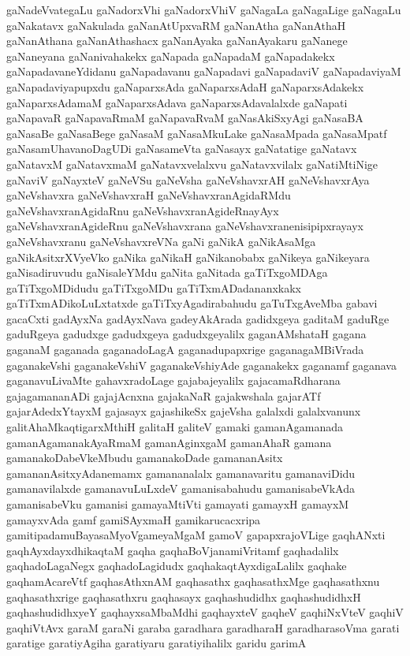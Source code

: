 {gaNadeVvategaLu
gaNadorxVhi
gaNadorxVhiV
gaNagaLa
gaNagaLige
gaNagaLu
gaNakatavx
gaNakulada
gaNanAtUpxvaRM
gaNanAtha
gaNanAthaH
gaNanAthana
gaNanAthashacx
gaNanAyaka
gaNanAyakaru
gaNanege
gaNaneyana
gaNanivahakekx
gaNapada
gaNapadaM
gaNapadakekx
gaNapadavaneYdidanu
gaNapadavanu
gaNapadavi
gaNapadaviV
gaNapadaviyaM
gaNapadaviyapupxdu
gaNaparxsAda
gaNaparxsAdaH
gaNaparxsAdakekx
gaNaparxsAdamaM
gaNaparxsAdava
gaNaparxsAdavalalxde
gaNapati
gaNapavaR
gaNapavaRmaM
gaNapavaRvaM
gaNasAkiSxyAgi
gaNasaBA
gaNasaBe
gaNasaBege
gaNasaM
gaNasaMkuLake
gaNasaMpada
gaNasaMpatf
gaNasamUhavanoDagUDi
gaNasameVta
gaNasayx
gaNatatige
gaNatavx
gaNatavxM
gaNatavxmaM
gaNatavxvelalxvu
gaNatavxvilalx
gaNatiMtiNige
gaNaviV
gaNayxteV
gaNeVSu
gaNeVsha
gaNeVshavxrAH
gaNeVshavxrAya
gaNeVshavxra
gaNeVshavxraH
gaNeVshavxranAgidaRMdu
gaNeVshavxranAgidaRnu
gaNeVshavxranAgideRnayAyx
gaNeVshavxranAgideRnu
gaNeVshavxrana
gaNeVshavxranenisipipxrayayx
gaNeVshavxranu
gaNeVshavxreVNa
gaNi
gaNikA
gaNikAsaMga
gaNikAsitxrXVyeVko
gaNika
gaNikaH
gaNikanobabx
gaNikeya
gaNikeyara
gaNisadiruvudu
gaNisaleYMdu
gaNita
gaNitada
gaTiTxgoMDAga
gaTiTxgoMDidudu
gaTiTxgoMDu
gaTiTxmADadananxkakx
gaTiTxmADikoLuLxtatxde
gaTiTxyAgadirabahudu
gaTuTxgAveMba
gabavi
gacaCxti
gadAyxNa
gadAyxNava
gadeyAkArada
gadidxgeya
gaditaM
gaduRge
gaduRgeya
gadudxge
gadudxgeya
gadudxgeyalilx
gaganAMshataH
gagana
gaganaM
gaganada
gaganadoLagA
gaganadupapxrige
gaganagaMBiVrada
gaganakeVshi
gaganakeVshiV
gaganakeVshiyAde
gaganakekx
gaganamf
gaganava
gaganavuLivaMte
gahavxradoLage
gajabajeyalilx
gajacamaRdharana
gajagamananADi
gajajAcnxna
gajakaNaR
gajakwshala
gajarATf
gajarAdedxYtayxM
gajasayx
gajashikeSx
gajeVsha
galalxdi
galalxvanunx
galitAhaMkaqtigarxMthiH
galitaH
galiteV
gamaki
gamanAgamanada
gamanAgamanakAyaRmaM
gamanAginxgaM
gamanAhaR
gamana
gamanakoDabeVkeMbudu
gamanakoDade
gamananAsitx
gamananAsitxyAdanemamx
gamananalalx
gamanavaritu
gamanaviDidu
gamanavilalxde
gamanavuLuLxdeV
gamanisabahudu
gamanisabeVkAda
gamanisabeVku
gamanisi
gamayaMtiVti
gamayati
gamayxH
gamayxM
gamayxvAda
gamf
gamiSAyxmaH
gamikarucacxripa
gamitipadamuBayasaMyoVgameyaMgaM
gamoV
gapapxrajoVLige
gaqhANxti
gaqhAyxdayxdhikaqtaM
gaqha
gaqhaBoVjanamiVritamf
gaqhadalilx
gaqhadoLagaNegx
gaqhadoLagidudx
gaqhakaqtAyxdigaLalilx
gaqhake
gaqhamAcareVtf
gaqhasAthxnAM
gaqhasathx
gaqhasathxMge
gaqhasathxnu
gaqhasathxrige
gaqhasathxru
gaqhasayx
gaqhashudidhx
gaqhashudidhxH
gaqhashudidhxyeY
gaqhayxsaMbaMdhi
gaqhayxteV
gaqheV
gaqhiNxVteV
gaqhiV
gaqhiVtAvx
garaM
garaNi
garaba
garadhara
garadharaH
garadharasoVma
garati
garatige
garatiyAgiha
garatiyaru
garatiyihalilx
garidu
garimA
}
